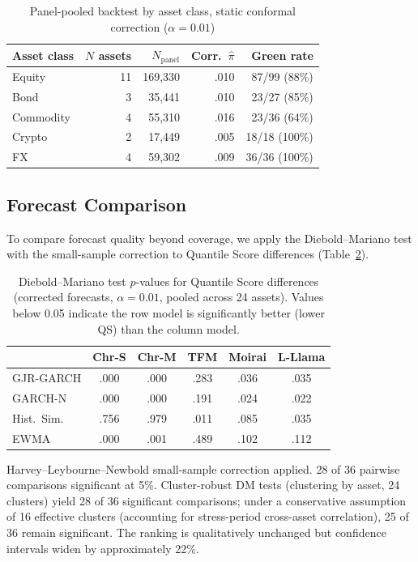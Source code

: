 \documentclass[preprint,11pt,authoryear]{elsarticle}
\newcommand{\1}{\boldsymbol{1}}
\begin{document}
	\begin{table}[H]
		\centering
		\caption{Panel-pooled backtest by asset class, static conformal correction ($\alpha = 0.01$)}
		\label{tab:panel_by_class}
		\footnotesize
		\begin{tabular}{@{}lrrrr@{}}
			\toprule
			Asset class & $N$ assets & $N_{\text{panel}}$ & Corr.\ $\hat\pi$ & Green rate \\
			\midrule
			Equity     & 11 & 169{,}330 & .010 & 87/99 (88\%) \\
			Bond       &  3 &  35{,}441 & .010 & 23/27 (85\%) \\
			Commodity  &  4 &  55{,}310 & .016 & 23/36 (64\%) \\
			Crypto     &  2 &  17{,}449 & .005 & 18/18 (100\%) \\
			FX         &  4 &  59{,}302 & .009 & 36/36 (100\%) \\
			\bottomrule
		\end{tabular}
	\end{table}
	
	
	\subsection{Forecast Comparison}
	\label{sec:forecast_eval}
	
	
	To compare forecast quality beyond coverage, we apply the
	Diebold--Mariano test \citep{diebold1995comparing} with the
	\citet{harvey1997testing} small-sample correction to Quantile
	Score differences (Table~\ref{tab:dm}).
	
	\begin{table}[H]
		\centering
		\caption{Diebold--Mariano test $p$-values for Quantile Score differences (corrected forecasts, $\alpha=0.01$, pooled across 24 assets). Values below 0.05 indicate the row model is significantly better (lower QS) than the column model.}
		\label{tab:dm}
		\footnotesize
		\begin{tabular}{@{}lccccc@{}}
			\toprule
			& Chr-S & Chr-M & TFM & Moirai & L-Llama \\
			\midrule
			GJR-GARCH   & .000 & .000 & .283 & .036 & .035 \\
			GARCH-N     & .000 & .000 & .191 & .024 & .022 \\
			Hist.\ Sim. & .756 & .979 & .011 & .085 & .035 \\
			EWMA        & .000 & .001 & .489 & .102 & .112 \\
			\bottomrule
		\end{tabular}
		\begin{minipage}{\linewidth}\footnotesize
			\smallskip
			Harvey--Leybourne--Newbold small-sample correction applied.
			28 of 36 pairwise comparisons significant at 5\%.
			Cluster-robust DM tests (clustering by asset, 24 clusters)
			yield 28 of 36 significant comparisons; under a conservative
			assumption of 16 effective clusters (accounting for
			stress-period cross-asset correlation), 25 of 36 remain
			significant. The ranking is qualitatively unchanged but
			confidence intervals widen by approximately 22\%.
		\end{minipage}
	\end{table}
	
\end{document}
